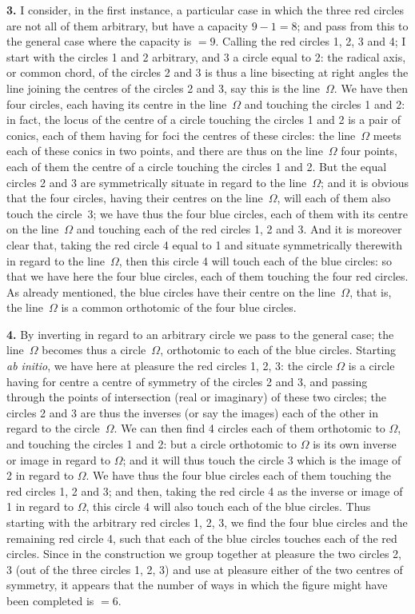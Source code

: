 \documentclass[11pt,a4paper]{book}
\begin{document}
\textbf{3.} I consider, in the first instance, a particular case in which the three red circles are not all of them arbitrary, but have a capacity $9-1=8$; and pass from this to the general case where the capacity is $=9$. Calling the red circles 1, 2, 3 and 4; I start with the circles 1 and 2 arbitrary, and 3 a circle equal to 2: the radical axis, or common chord, of the circles 2 and 3 is thus a line bisecting at right angles the line joining the centres of the circles 2 and 3, say this is the line~$\Omega$. We have then four circles, each having its centre in the line~$\Omega$ and touching the circles 1 and 2: in fact, the locus of the centre of a circle touching the circles 1 and 2 is a pair of conics, each of them having for foci the centres of these circles: the line~$\Omega$ meets each of these conics in two points, and there are thus on the line~$\Omega$ four points, each of them the centre of a circle touching the circles 1 and 2. But the equal circles 2 and 3 are symmetrically situate in regard to the line~$\Omega$; and it is obvious that the four circles, having their centres on the line~$\Omega$, will each of them also touch the circle~3; we have thus the four blue circles, each of them with its centre on the line~$\Omega$ and touching each of the red circles 1, 2 and 3. And it is moreover clear that, taking the red circle 4 equal to 1 and situate symmetrically therewith in regard to the line~$\Omega$, then this circle 4 will touch each of the blue circles: so that we have here the four blue circles, each of them touching the four red circles. As already mentioned, the blue circles have their centre on the line~$\Omega$, that is, the line~$\Omega$ is a common orthotomic of the four blue circles.

\textbf{4.} By inverting in regard to an arbitrary circle we pass to the general case; the line~$\Omega$ becomes thus a circle~$\Omega$, orthotomic to each of the blue circles. Starting \textit{ab initio}, we have here at pleasure the red circles 1, 2, 3: the circle $\Omega$ is a circle having for centre a centre of symmetry of the circles 2 and 3, and passing through the points of intersection (real or imaginary) of these two circles; the circles 2 and 3 are thus the inverses (or say the images) each of the other in regard to the circle~$\Omega$. We can then find 4 circles each of them orthotomic to $\Omega$, and touching the circles 1 and 2: but a circle orthotomic to $\Omega$ is its own inverse or image in regard to $\Omega$; and it will thus touch the circle 3 which is the image of 2 in regard to $\Omega$. We have thus the four blue circles each of them touching the red circles 1, 2 and 3; and then, taking the red circle 4 as the inverse or image of 1 in regard to $\Omega$, this circle 4 will also touch each of the blue circles. Thus starting with the arbitrary red circles 1, 2, 3, we find the four blue circles and the remaining red circle 4, such that each of the blue circles touches each of the red circles. Since in the construction we group together at pleasure the two circles 2, 3 (out of the three circles 1, 2, 3) and use at pleasure either of the two centres of symmetry, it appears that the number of ways in which the figure might have been completed is $=6$.
\end{document}
